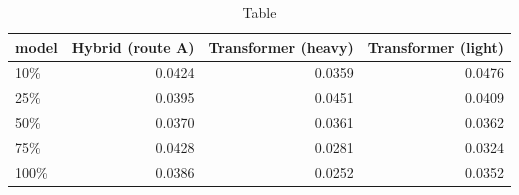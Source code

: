 \begin{table}
\caption{Table}
\label{tab:table}
\begin{tabular}{lrrr}
\toprule
model & Hybrid (route A) & Transformer (heavy) & Transformer (light) \\
\midrule
10\% & 0.0424 & 0.0359 & 0.0476 \\
25\% & 0.0395 & 0.0451 & 0.0409 \\
50\% & 0.0370 & 0.0361 & 0.0362 \\
75\% & 0.0428 & 0.0281 & 0.0324 \\
100\% & 0.0386 & 0.0252 & 0.0352 \\
\bottomrule
\end{tabular}
\end{table}
